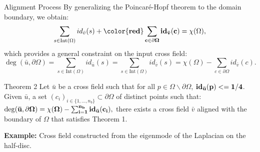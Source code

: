 \documentclass[compress,10pt,aspectratio=169]{beamer}
\begin{document}
\begin{frame}{Alignment Process}
\vspace{-0.2cm}
\small
By generalizing the Poincaré-Hopf theorem to the domain boundary, we obtain:
\begin{equation*}
\sum_{s\in \text{Int}(\Omega)} id_{\bar{v}}(s)+{\bf \color{red}\sum_{c\in \partial\Omega} id_{\bar{v}}(c)} = \chi(\Omega),
\label{poincareformula_3}
\end{equation*}
which provides a general constraint on the input cross field:
\begin{equation*}
\deg(\bar{u}, \partial\Omega) =\sum_{s\in \text{Int}(\Omega)} id_{\bar{u}}(s) = \sum_{s\in \text{Int}(\Omega)} id_{\bar{v}}(s) = \chi(\Omega)-\sum_{c\in \partial \Omega} id_{\bar{v}}(c).
\label{third_u_c}
\end{equation*}
\begin{onerablock}{Theorem 2}
Let $\bar{u}$ be a cross field such that for all $p\in\Omega\backslash\partial\Omega$, ${\bf id_{\bar{u}}(p)<=1/4}$. Given $\bar{u}$, a set $(c_i)_{i\in\{1,\dots,n_b\}}\subset\partial\Omega$ of distinct points such that:
$
{\bf \deg(\bar{u}, \partial\Omega) = \chi(\Omega)-\sum_{i=1}^{n_b} id_{\bar{u}}(c_i),}
$
there exists a cross field $\bar{v}$ aligned with the boundary of $\Omega$ that satisfies Theorem 1.
\end{onerablock}
\vspace{0.1cm}
{\bf Example:} Cross field constructed from the eigenmode of the Laplacian on the half-disc.
\end{frame}
\end{document}
